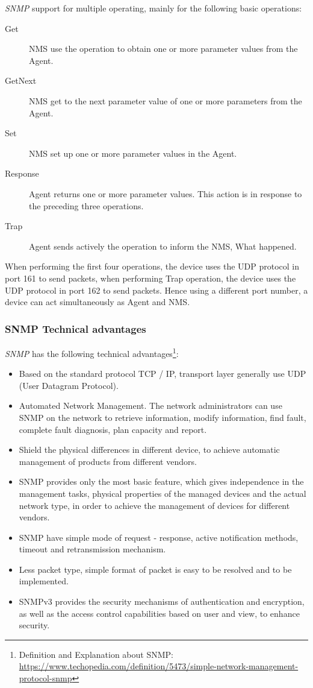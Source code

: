\textit{SNMP} support for multiple operating, mainly for the following basic operations:

\begin{description}
	\item[Get] NMS use the operation to obtain one or more parameter values from the Agent.
	\item[GetNext] NMS get to the next parameter value of one or more parameters from the Agent.
	\item[Set] NMS set up one or more parameter values in the Agent.
	\item[Response] Agent returns one or more parameter values. This action is in response to the preceding three operations.
	\item[Trap] Agent sends actively the operation to inform the NMS, What happened.
\end{description}

When performing the first four operations, the device uses the UDP protocol in port 161 to send packets, when performing Trap operation, the device uses the UDP protocol in port 162 to send packets. Hence using a different port number, a device can act simultaneously as Agent and NMS.

\subsubsection{SNMP Technical advantages}

\textit{SNMP} has the following technical advantages\footnote{Definition and Explanation about SNMP: \url{https://www.techopedia.com/definition/5473/simple-network-management-protocol-snmp}}:  

\begin{itemize}
	\item Based on the standard protocol TCP / IP, transport layer generally use UDP (User Datagram Protocol).  
	\item Automated Network Management. The network administrators can use SNMP on the network to retrieve information, modify information, find fault, complete fault diagnosis, plan capacity and report.  
	\item Shield the physical differences in different device, to achieve automatic management of products from different vendors.  
	\item SNMP provides only the most basic feature, which gives independence in the management tasks, physical properties of the managed devices and the actual network type, in order to achieve the management of devices for different vendors.  
	\item SNMP have simple mode of request - response, active notification methods, timeout and retransmission mechanism.  
	\item Less packet type, simple format of packet is easy to be resolved and to be implemented.  
	\item SNMPv3 provides the security mechanisms of authentication and encryption, as well as the access control capabilities based on user and view, to enhance security.
\end{itemize}


